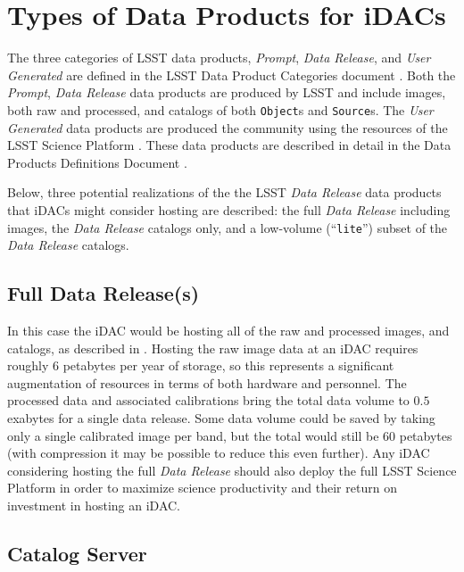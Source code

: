 \section{Types of Data Products for iDACs}\label{sec:data}
 
The three categories of LSST data products, {\it Prompt}, {\it Data Release}, and {\it User Generated} are defined in the LSST Data Product Categories document  . 
Both the {\it Prompt}, {\it Data Release} data products are produced by LSST and include images, both raw and processed, and catalogs of both {\tt Object}s and {\tt Source}s. 
The  {\it User Generated} data products are produced the community using the resources of the LSST Science Platform . 
These data products are described in detail in the Data Products Definitions Document . 

Below, three potential realizations of the the LSST {\it Data Release} data products that iDACs might consider hosting are described: the full {\it Data Release} including images, the {\it Data Release} catalogs only, and a low-volume (``{\tt lite}'') subset of the {\it Data Release} catalogs.

\subsection{Full Data Release(s)}

In this case the iDAC would be hosting all of the raw and processed images, and catalogs, as described in . Hosting the raw image data at an iDAC requires roughly $6$ petabytes per year of storage, so this represents a significant augmentation of resources in terms of both hardware and personnel. The processed data and associated calibrations bring the total data volume to $0.5$ exabytes for a single data release. Some data volume could be saved by taking only a single calibrated image per band, but the total would still be $60$ petabytes (with compression it may be possible to reduce this even further). Any iDAC considering hosting the full {\it Data Release} should also deploy the full LSST Science Platform  in order to maximize science productivity and their return on investment in hosting an iDAC.

\subsection{Catalog Server}	

